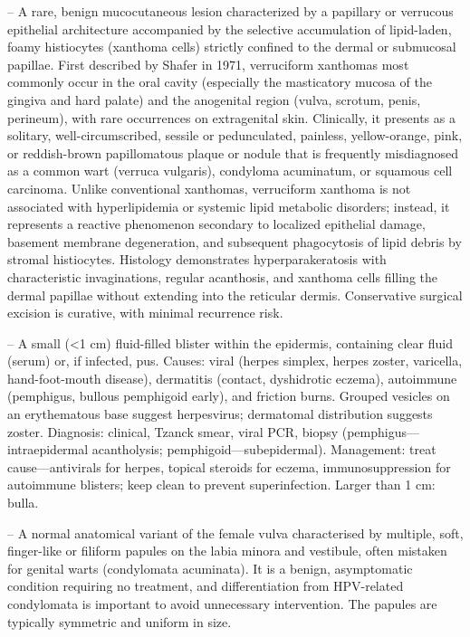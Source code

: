 -- A rare, benign mucocutaneous lesion characterized by a papillary or verrucous epithelial architecture accompanied by the selective accumulation of lipid-laden, foamy histiocytes (xanthoma cells) strictly confined to the dermal or submucosal papillae. First described by Shafer in 1971, verruciform xanthomas most commonly occur in the oral cavity (especially the masticatory mucosa of the gingiva and hard palate) and the anogenital region (vulva, scrotum, penis, perineum), with rare occurrences on extragenital skin. Clinically, it presents as a solitary, well-circumscribed, sessile or pedunculated, painless, yellow-orange, pink, or reddish-brown papillomatous plaque or nodule that is frequently misdiagnosed as a common wart (verruca vulgaris), condyloma acuminatum, or squamous cell carcinoma. Unlike conventional xanthomas, verruciform xanthoma is not associated with hyperlipidemia or systemic lipid metabolic disorders; instead, it represents a reactive phenomenon secondary to localized epithelial damage, basement membrane degeneration, and subsequent phagocytosis of lipid debris by stromal histiocytes. Histology demonstrates hyperparakeratosis with characteristic invaginations, regular acanthosis, and xanthoma cells filling the dermal papillae without extending into the reticular dermis. Conservative surgical excision is curative, with minimal recurrence risk.

-- A small (<1 cm) fluid-filled blister within the epidermis, containing clear fluid (serum) or, if infected, pus. Causes: viral (herpes simplex, herpes zoster, varicella, hand-foot-mouth disease), dermatitis (contact, dyshidrotic eczema), autoimmune (pemphigus, bullous pemphigoid early), and friction burns. Grouped vesicles on an erythematous base suggest herpesvirus; dermatomal distribution suggests zoster. Diagnosis: clinical, Tzanck smear, viral PCR, biopsy (pemphigus—intraepidermal acantholysis; pemphigoid—subepidermal). Management: treat cause—antivirals for herpes, topical steroids for eczema, immunosuppression for autoimmune blisters; keep clean to prevent superinfection. Larger than 1 cm: bulla.

-- A normal anatomical variant of the female vulva characterised by multiple, soft, finger-like or filiform papules on the labia minora and vestibule, often mistaken for genital warts (condylomata acuminata). It is a benign, asymptomatic condition requiring no treatment, and differentiation from HPV-related condylomata is important to avoid unnecessary intervention. The papules are typically symmetric and uniform in size.

